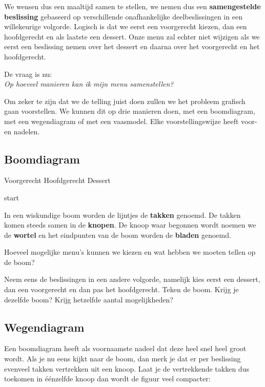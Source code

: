 \documentclass[12pt,twoside]{article}
\begin{document}
We wensen dus een maaltijd samen te stellen, we nemen dus een {\bf samengestelde beslissing} gebaseerd op verschillende onafhankelijke deelbeslissingen in een willekeurige volgorde. Logisch is dat we eerst een voorgerecht kiezen, dan een hoofdgerecht en als laatste een dessert. Onze menu zal echter niet wijzigen als we eerst een beslissing nemen over het dessert en daarna over het voorgerecht en het hoofdgerecht.

De vraag is nu:\\
{\em Op hoeveel manieren kan ik mijn menu samenstellen?}

Om zeker te zijn dat we de telling juist doen zullen we het probleem grafisch gaan voorstellen. We kunnen dit op drie manieren doen, met een boomdiagram, met een wegendiagram of met een vaasmodel. Elke voorstellingswijze heeft voor- en nadelen.

\subsection{Boomdiagram}

\hspace*{2cm} Voorgerecht \hfill Hoofdgerecht \hfill Dessert \hspace*{2cm}

\vspace*{8cm}
start
\vspace*{8cm}

In een wiskundige boom worden de lijntjes de {\bf takken} genoemd. De takken komen steeds samen in de {\bf knopen}. De knoop waar begonnen wordt noemen we de {\bf wortel} en het eindpunten van de boom worden de {\bf bladen} genoemd.

\begin{oefening}
Hoeveel mogelijke menu's kunnen we kiezen en wat hebben we moeten tellen op de boom?
\end{oefening}

\begin{oefening}
Neem eens de beslissingen in een andere volgorde, namelijk kies eerst een dessert, dan een voorgerecht en dan pas het hoofdgerecht. Teken de boom. Krijg je dezelfde boom? Krijg hetzelfde aantal mogelijkheden?
\end{oefening}

\subsection{Wegendiagram}

Een boomdiagram heeft als voornaamste nadeel dat deze heel snel heel groot wordt. Als je nu eens kijkt naar de boom, dan merk je dat er per beslissing evenveel takken vertrekken uit een knoop. Laat je de vertrekkende takken dus toekomen in éénzelfde knoop dan wordt de figuur veel compacter:
\end{document}
